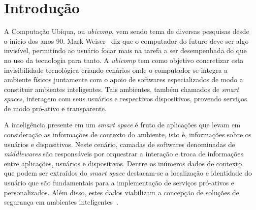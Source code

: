 \chapter{Introdução}

	
A Computação Ubíqua, ou \textit{ubicomp}, vem sendo tema de diversas
pesquisas desde o início dos anos 90. Mark Weiser~\cite{weiser1, weiser2} diz que o computador do futuro deve ser
algo invisível, permitindo ao usuário focar mais na tarefa a ser desempenhada do que no uso da tecnologia para tanto.
A \textit{ubicomp} tem como objetivo concretizar esta invisibilidade tecnológica criando cenários onde o computador se integra a ambiente físicos juntamente com o apoio de softwares especializados de modo a constituir ambientes inteligentes. Tais ambientes, também chamados de \textit{smart spaces}, interagem com seus usuários e respectivos dispositivos, provendo serviços de modo pró-ativo e transparente.

	
A inteligência presente em um \textit{smart space} é fruto de aplicações que levam em consideração as informações de contexto do ambiente, isto é, informações sobre os usuários e dispositivos. Neste cenário, camadas de softwares denominadas de \textit{middlewares} são responsáveis por orquestrar a interação e troca de informações entre aplicações, usuários e dispositivos. Dentre os inúmeros dados de contexto que podem ser extraídos do \textit{smart space} destacam-se a localização e identidade do usuário que são fundamentais para a implementação de serviços pró-ativos e personalizados. Além disso, estes dados viabilizam a concepção de soluções de segurança em ambientes inteligentes~\cite{saocarlos}.


	
